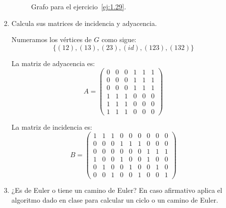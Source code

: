 \begin{ejercicio}
\begin{enumerate}
\begin{enumerate}
\begin{figure}
                \caption{Grafo para el ejercicio~\ref{ej:1.29}.}
                \label{fig:1.29}
            \end{figure}
            \item Calcula sus matrices de incidencia y adyacencia.
            
            Numeramos los vértices de $G$ como sigue:
            \begin{equation*}
                \{(12),(13),(23),(id),(123),(132)\}
            \end{equation*}

            La matriz de adyacencia es:
            \[
                A=\begin{pmatrix}
                    0 & 0 & 0 & 1 & 1 & 1 \\
                    0 & 0 & 0 & 1 & 1 & 1 \\
                    0 & 0 & 0 & 1 & 1 & 1 \\
                    1 & 1 & 1 & 0 & 0 & 0 \\
                    1 & 1 & 1 & 0 & 0 & 0 \\
                    1 & 1 & 1 & 0 & 0 & 0
                \end{pmatrix}
            \]

            La matriz de incidencia es:
            \[
                B=\begin{pmatrix}
                    1 & 1 & 1 & 0 & 0 & 0 & 0 & 0 & 0 \\
                    0 & 0 & 0 & 1 & 1 & 1 & 0 & 0 & 0 \\
                    0 & 0 & 0 & 0 & 0 & 0 & 1 & 1 & 1 \\
                    1 & 0 & 0 & 1 & 0 & 0 & 1 & 0 & 0 \\
                    0 & 1 & 0 & 0 & 1 & 0 & 0 & 1 & 0 \\
                    0 & 0 & 1 & 0 & 0 & 1 & 0 & 0 & 1
                \end{pmatrix}
            \]
            \item ¿Es de Euler o tiene un camino de Euler? En caso afirmativo aplica el algoritmo dado en clase para calcular un ciclo o un camino de Euler.\\
            

\end{enumerate}
\end{enumerate}
\end{ejercicio}
